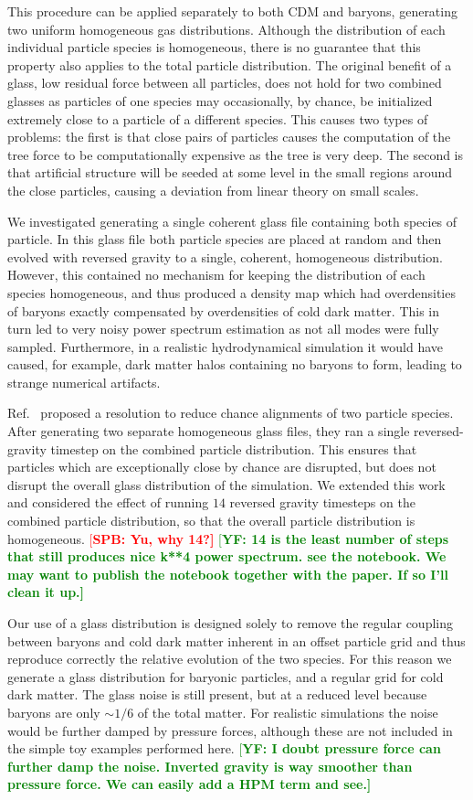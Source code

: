 \documentclass[a4paper,11pt]{article}
\newcommand{\spb}[1]{\textcolor{red}{[\bf SPB: #1]} }
\newcommand{\YF}[1]{\textcolor{green}{[\bf YF: #1]} }
\begin{document}
This procedure can be applied separately to both CDM and baryons, generating two uniform homogeneous gas distributions.
Although the distribution of each individual particle species is homogeneous, there is no guarantee that this property also applies to
the total particle distribution. The original benefit of a glass, low residual force between all particles, does not hold for two combined glasses \cite{Yoshida:2003} as particles of one species may occasionally, by chance, be initialized extremely close to a particle of a different species. This causes two types of problems: the first is that close pairs of particles causes the computation of the tree force to be computationally expensive as the tree is very deep. The second is that artificial structure will be seeded at some level in the small regions around the close particles, causing a deviation from linear theory on small scales.

We investigated generating a single coherent glass file containing both species of particle. In this glass file both particle species are placed at random and then evolved with reversed gravity to a single, coherent, homogeneous distribution. However, this contained no mechanism for keeping the distribution of each species homogeneous, and thus produced a density map which had overdensities of baryons exactly compensated by overdensities of cold dark matter. This in turn led to very noisy power spectrum estimation as not all modes were fully sampled. Furthermore, in a realistic hydrodynamical simulation it would have caused, for example, dark matter halos containing no baryons to form, leading to strange numerical artifacts.

Ref.~\cite{Yoshida:2003} proposed a resolution to reduce chance alignments of two particle species. After generating two separate homogeneous glass files, they ran a single reversed-gravity timestep on the combined particle distribution. This ensures that particles which are exceptionally close by chance are disrupted, but does not disrupt the overall glass distribution of the simulation. We extended this work and considered the effect of running $14$ reversed gravity timesteps on the combined particle distribution, so that the overall particle distribution is homogeneous. \spb{Yu, why 14?} \YF{14 is the least number of steps that still produces nice k**4 power spectrum. see the notebook. We may want to publish the notebook together with the paper. If so I'll clean it up.}

Our use of a glass distribution is designed solely to remove the regular coupling between baryons and cold dark matter inherent in an offset particle grid and thus reproduce correctly the relative evolution of the two species. For this reason we generate a glass distribution for baryonic particles, and a regular grid for cold dark matter. The glass noise is still present, but at a reduced level because baryons are only $\sim 1/6$ of the total matter. For realistic simulations the noise would be further damped by pressure forces, although these are not included in the simple toy examples performed here. \YF{I doubt pressure force can further damp the noise. Inverted gravity is way smoother than pressure force. We can easily add a HPM term and see.}
\end{document}
